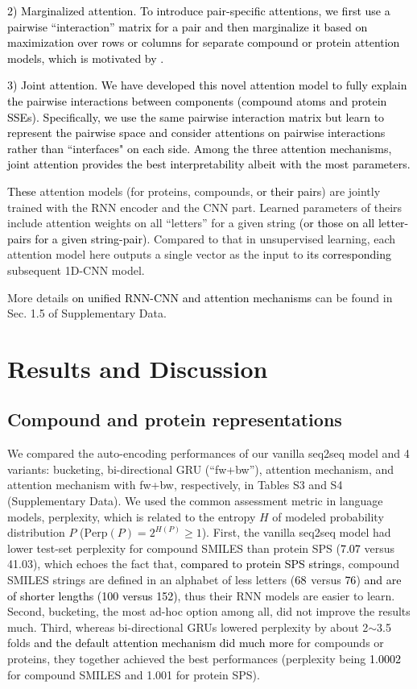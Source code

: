 \documentclass[nocrop]{bioinfo}
\newcommand{\red}[1]{\textcolor{black}{#1}}
\begin{document}
\red{2) Marginalized attention. To introduce pair-specific attentions, we first use a pairwise ``interaction'' matrix for a pair and then marginalize it based on maximization over rows or columns for separate compound or protein attention models, which is motivated by \cite{lu2016hierarchical}.} 

\red{3) Joint attention. We have developed this novel attention model to fully explain the pairwise interactions between components (compound atoms and protein SSEs). Specifically, we use the same pairwise interaction matrix but learn to represent the pairwise space and consider attentions on pairwise interactions rather than ``interfaces" on each side. Among the three attention mechanisms, joint attention provides the best interpretability albeit with the most parameters.}

\red{These} attention models  (for proteins,  compounds, \red{or their pairs}) are jointly trained with the RNN encoder and the CNN part.  Learned parameters of theirs include attention weights on all ``letters'' for a given string \red{(or those on all letter-pairs for a given string-pair)}.  Compared to that in unsupervised learning, each attention model here outputs a single vector as the input to \red{its corresponding} subsequent 1D-CNN model.

More details \red{on unified RNN-CNN and attention mechanisms} can be found in Sec. 1.5 of Supplementary Data.



\vspace{-2em}
\section{Results and Discussion}
\subsection{Compound and protein representations}

We compared the auto-encoding performances of our vanilla seq2seq model and 4 variants: bucketing, bi-directional GRU  (``fw+bw''), attention mechanism, and attention mechanism with fw+bw, respectively, in Tables S3 and S4  (Supplementary Data).  We used the common assessment metric in language models, perplexity, which is related to the entropy $H$ of modeled probability distribution $P$  ($\mbox{Perp} (P)=2^{H (P)} \geqslant 1$).  First, the vanilla seq2seq model had lower test-set perplexity for compound SMILES than protein SPS  (\red{7.07} versus 41.03), which echoes the fact that, \red{compared to protein SPS strings}, compound SMILES strings are defined in an alphabet of less letters   ($\red{68}$ versus \red{76}) \red{and are of shorter lengths  (100 versus 152)}, thus their RNN models are easier to learn.  Second, bucketing, the most ad-hoc option among all, did not improve the results much.  Third, whereas bi-directional GRUs lowered perplexity by about 2$\sim$3.5 folds \red{and the default attention mechanism did much more} for compounds or proteins, they together achieved the best performances  (perplexity being \red{1.0002} for compound SMILES and 1.001 for protein SPS). 
\end{document}
